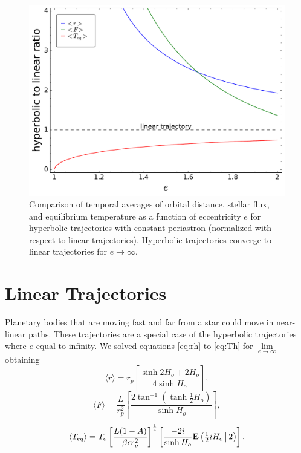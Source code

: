 \documentclass[a4paper,fleqn,usenatbib]{mnras}
\begin{document}
\begin{figure}
\includegraphics[width=\columnwidth]{f3.pdf}
\caption{Comparison of temporal averages of orbital distance, stellar flux, and equilibrium temperature as a function of eccentricity $e$ for hyperbolic trajectories with constant periastron (normalized with respect to linear trajectories). Hyperbolic trajectories converge to linear trajectories for $e \to \infty$.}
\label{fig3}
\end{figure}


\section{Linear Trajectories}
\label{sec:linear}

Planetary bodies that are moving fast and far from a star  could move in near-linear paths. These trajectories are a special case of the hyperbolic trajectories where $e$ equal to infinity. We solved equations \ref{eq:rh} to \ref{eq:Th} for $\lim\limits_{e \to \infty}$ obtaining
\begin{equation} \label{eq:rl}
\langle r \rangle = r_p \left[\frac{\sinh 2H_o  + 2H_o}{4 \sinh H_o } \right],
\end{equation}
\begin{equation} \label{eq:Fl}
\langle F \rangle = \frac{L}{r_p^2} \left[ \frac{2 \tan^{-1} \left( \tanh \frac{1}{2} H_o \right)}{\sinh H_o } \right],
\end{equation}
\begin{equation} \label{eq:Tl}
\langle T_{eq} \rangle = T_o \left[\frac{L {\left(1 - A\right)}}{\beta \epsilon r_p^{2}}\right]^{\frac{1}{4}} \left[ \frac{-2 i}{\sinh H_o } {\rm \mathbf{E}} \left(\tfrac{1}{2}iH_o\, \big| \,2 \right) \right].
\end{equation}
\end{document}
